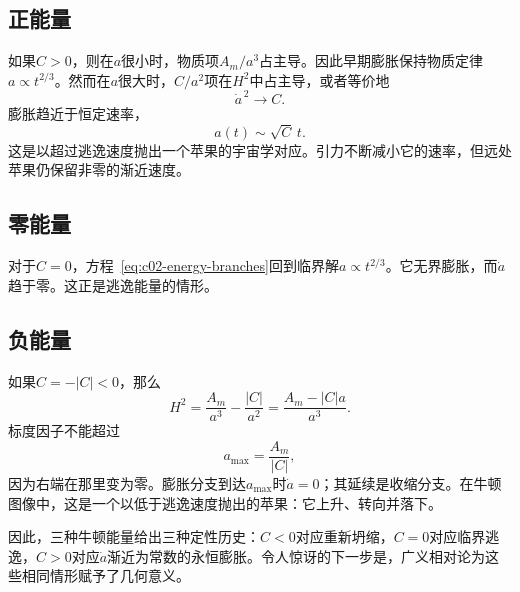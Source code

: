 \subsection{正能量}

如果\(C>0\)，则在\(a\)很小时，物质项\(A_m/a^3\)占主导。因此早期膨胀保持物质定律\(a\propto t^{2/3}\)。然而在\(a\)很大时，\(C/a^2\)项在\(H^2\)中占主导，或者等价地
\begin{equation}
\dot a^{\,2}\longrightarrow C.
\end{equation}
膨胀趋近于恒定速率，
\begin{equation}
a(t)\sim\sqrt C\,t.
\label{eq:c02-positive-late}
\end{equation}
这是以超过逃逸速度抛出一个苹果的宇宙学对应。引力不断减小它的速率，但远处苹果仍保留非零的渐近速度。

\subsection{零能量}

对于\(C=0\)，方程~\eqref{eq:c02-energy-branches}回到临界解\(a\propto t^{2/3}\)。它无界膨胀，而\(\dot a\)趋于零。这正是逃逸能量的情形。

\subsection{负能量}

如果\(C=-|C|<0\)，那么
\begin{equation}
H^2=\frac{A_m}{a^3}-\frac{|C|}{a^2}
=\frac{A_m-|C|a}{a^3}.
\label{eq:c02-negative-energy}
\end{equation}
标度因子不能超过
\begin{equation}
a_{\max}=\frac{A_m}{|C|},
\label{eq:c02-amax}
\end{equation}
因为右端在那里变为零。膨胀分支到达\(a_{\max}\)时\(\dot a=0\)；其延续是收缩分支。在牛顿图像中，这是一个以低于逃逸速度抛出的苹果：它上升、转向并落下。

\begin{classroomqa}
\end{classroomqa}

因此，三种牛顿能量给出三种定性历史：\(C<0\)对应重新坍缩，\(C=0\)对应临界逃逸，\(C>0\)对应\(\dot a\)渐近为常数的永恒膨胀。令人惊讶的下一步是，广义相对论为这些相同情形赋予了几何意义。

